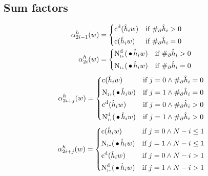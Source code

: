 \subsection{Sum factors}

\begin{subequations}
  \begin{align}
    \SumArg_{2 i - 1}^h(w) &=
      \begin{dcases*}
        \DiscountedCount(\DerivedHistory[i] w)        & if $\NumSkpOp{\DerivedHistory[i]} > 0$ \\
        \Count(\DerivedHistory[i] w)                  & if $\NumSkpOp{\DerivedHistory[i]} = 0$
      \end{dcases*} \\
    \SumArg_{2 i}^h(w) &=
      \begin{dcases*}
        \DiscountedCount*(\WSkp \DerivedHistory[i] w) & if $\NumSkpOp{\DerivedHistory[i]} > 0$ \\
        \ContCountIp(\WSkp \DerivedHistory[i] w)      & if $\NumSkpOp{\DerivedHistory[i]} = 0$
      \end{dcases*}
  \end{align}
\end{subequations}
\begin{equation}
  \SumArg_{2 i + j}^h(w) =
    \begin{dcases*}
      \Count(\DerivedHistory[i] w)                  & if $j = 0 \land \NumSkpOp{\DerivedHistory[i]} = 0$ \\
      \ContCountIp(\WSkp \DerivedHistory[i] w)      & if $j = 1 \land \NumSkpOp{\DerivedHistory[i]} = 0$ \\
      \DiscountedCount(\DerivedHistory[i] w)        & if $j = 0 \land \NumSkpOp{\DerivedHistory[i]} > 0$ \\
      \DiscountedCount*(\WSkp \DerivedHistory[i] w) & if $j = 1 \land \NumSkpOp{\DerivedHistory[i]} > 0$
    \end{dcases*}
\end{equation}
\begin{equation}
  \SumArg_{2 i + j}^h(w) =
    \begin{dcases*}
      \Count(\DerivedHistory[i] w)                  & if $j = 0 \land N - i \leq 1$ \\
      \ContCountIp(\WSkp \DerivedHistory[i] w)      & if $j = 1 \land N - i \leq 1$ \\
      \DiscountedCount(\DerivedHistory[i] w)        & if $j = 0 \land N - i > 1$ \\
      \DiscountedCount*(\WSkp \DerivedHistory[i] w) & if $j = 1 \land N - i > 1$
    \end{dcases*}
\end{equation}

